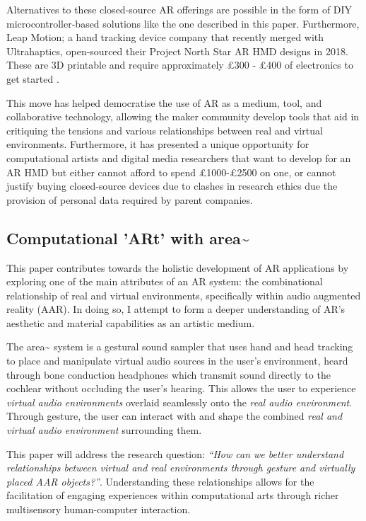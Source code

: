 Alternatives to these closed-source AR offerings are possible in the form of DIY microcontroller-based solutions like the one described in this paper. Furthermore, Leap Motion; a hand tracking device company that recently merged with Ultrahaptics, open-sourced their Project North Star AR HMD designs in 2018. These are 3D printable and require approximately £300 - £400 of electronics to get started \citep{leapmotion2018}.

This move has helped democratise the use of AR as a medium, tool, and collaborative technology, allowing the maker community develop tools \citep{rompapas2020} that aid in critiquing the tensions and various relationships between real and virtual environments. Furthermore, it has presented a unique opportunity for computational artists and digital media researchers that want to develop for an AR HMD but either cannot afford to spend £1000-£2500 on one, or cannot justify buying closed-source devices due to clashes in research ethics due the provision of personal data required by parent companies.

\subsection{Computational 'ARt' with area\textasciitilde{}} \label{sec: area-intro-area}
This paper contributes towards the holistic development of AR applications by exploring one of the main attributes of an AR system: the combinational relationship of real and virtual environments, specifically within audio augmented reality (AAR). In doing so, I attempt to form a deeper understanding of AR's aesthetic and material capabilities as an artistic medium.

The area\textasciitilde{} system is a gestural sound sampler that uses hand and head tracking to place and manipulate virtual audio sources in the user’s environment, heard through bone conduction headphones which transmit sound directly to the cochlear without occluding the user’s hearing. This allows the user to experience \textit{virtual audio environments} overlaid seamlessly onto the \textit{real audio environment}. Through gesture, the user can interact with and shape the combined \textit{real and virtual audio environment} surrounding them.

This paper will address the research question: \textit{“How can we better understand relationships between virtual and real environments through gesture and virtually placed AAR objects?”}. Understanding these relationships allows for the facilitation of engaging experiences within computational arts through richer multisensory human-computer interaction.

